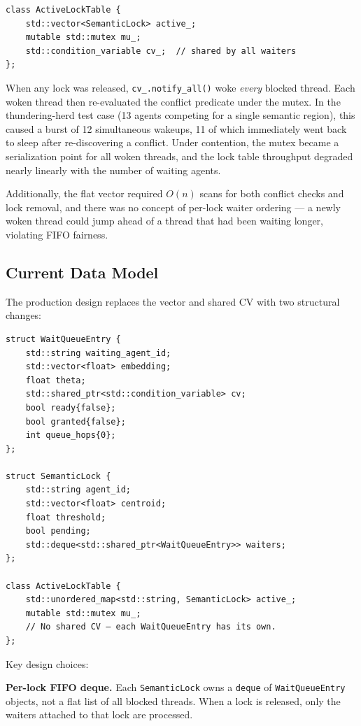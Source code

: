 \documentclass[sigconf]{acmart}
\begin{document}
\begin{lstlisting}[caption={Early single-CV design}]
class ActiveLockTable {
    std::vector<SemanticLock> active_;
    mutable std::mutex mu_;
    std::condition_variable cv_;  // shared by all waiters
};
\end{lstlisting}

When any lock was released, \texttt{cv\_.notify\_all()} woke \emph{every} blocked thread.
Each woken thread then re-evaluated the conflict predicate under the mutex. In the
thundering-herd test case (13 agents competing for a single semantic region), this caused
a burst of 12 simultaneous wakeups, 11 of which immediately went back to sleep after
re-discovering a conflict. Under contention, the mutex became a serialization point for
all woken threads, and the lock table throughput degraded nearly linearly with the number
of waiting agents.

Additionally, the flat vector required $O(n)$ scans for both conflict checks and lock
removal, and there was no concept of per-lock waiter ordering — a newly woken thread
could jump ahead of a thread that had been waiting longer, violating FIFO fairness.

\subsection{Current Data Model}

The production design replaces the vector and shared CV with two structural changes:

\begin{lstlisting}[caption={Current per-waiter CV design}]
struct WaitQueueEntry {
    std::string waiting_agent_id;
    std::vector<float> embedding;
    float theta;
    std::shared_ptr<std::condition_variable> cv;
    bool ready{false};
    bool granted{false};
    int queue_hops{0};
};

struct SemanticLock {
    std::string agent_id;
    std::vector<float> centroid;
    float threshold;
    bool pending;
    std::deque<std::shared_ptr<WaitQueueEntry>> waiters;
};

class ActiveLockTable {
    std::unordered_map<std::string, SemanticLock> active_;
    mutable std::mutex mu_;
    // No shared CV — each WaitQueueEntry has its own.
};
\end{lstlisting}

\noindent Key design choices:

\textbf{Per-lock FIFO deque.} Each \texttt{SemanticLock} owns a
\texttt{deque} of \texttt{Wait\-Queue\-Entry} objects, not a flat list of all blocked
threads. When a lock is released, only the waiters attached to that lock are processed.
\end{document}
